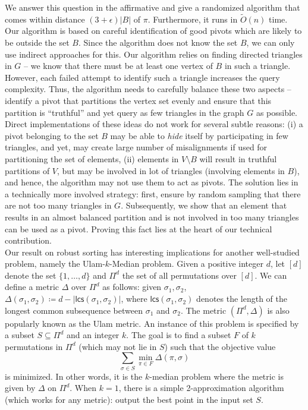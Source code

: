 \documentclass[11pt]{llncs}
\newcommand{\lcs}{{\textsf{lcs}}}
\begin{document}
We answer this question in the affirmative and give a randomized algorithm that comes within distance  $(3+\epsilon)|B|$ of $\pi$. Furthermore, it runs in $\tilde{O}(n)$ time.
Our algorithm is based on careful identification of good pivots which are likely to be outside the set $B$. Since the algorithm does not know the set $B$, we can only use indirect approaches for this. Our algorithm relies on finding directed triangles in $G$ -- we know that there must be at least one vertex of $B$ in such a triangle. However, each failed attempt to identify such a triangle increases the query complexity. Thus, the algorithm needs to carefully balance these two aspects -- identify a pivot that partitions the vertex set evenly and ensure that this partition is ``truthful'' and yet query as few triangles in the graph $G$ as possible. Direct implementations of these ideas do not work for several subtle reasons: (i) a pivot belonging to the set $B$ may be able to {\em hide} itself by participating in few triangles, and yet, may create large number of misalignments if used for partitioning the set of elements, (ii) elements in $V \setminus B$ will result in truthful partitions of $V$, but may be involved in lot of triangles (involving elements in $B$), and hence, the algorithm may not use them to act as pivots. The solution lies in a technically more involved strategy: first, ensure by random sampling that there are not too many triangles in $G$. Subsequently, we show that an element that results in an almost balanced partition and is not involved in too many triangles can be used as a pivot. Proving this fact lies at the heart of our technical contribution. \\




 Our result on robust sorting has interesting implications for another well-studied problem, namely the Ulam-$k$-Median problem. Given a positive integer $d$, let $[d]$ denote the set $\{1, \ldots, d\}$ and $\Pi^d$ the set of all permutations over $[d]$. We can define a metric $\Delta$ over $\Pi^d$ as follows: given $\sigma_1, \sigma_2$, $\Delta(\sigma_1, \sigma_2) \coloneqq d-|\lcs(\sigma_1, \sigma_2)|$, where $\lcs(\sigma_1, \sigma_2)$ denotes the length of the longest common subsequence between $\sigma_1$ and $\sigma_2$. The metric $(\Pi^d, \Delta)$ is also popularly known as the Ulam metric.
An instance of this problem is specified by a subset $S \subseteq \Pi^d$ and an integer $k$. The goal is to find a subset $F$ of $k$ permutations in $\Pi^d$ (which may not lie in $S$) such that the objective value
$$ \sum_{\sigma \in S} \min_{\pi \in F} \Delta(\pi, \sigma)$$
is minimized. In other words, it is the $k$-median problem where the metric is given by $\Delta$ on $\Pi^d$. When $k=1$, there is a simple 2-approximation algorithm (which works for any metric): output the best point in the input set $S$. 
\end{document}
